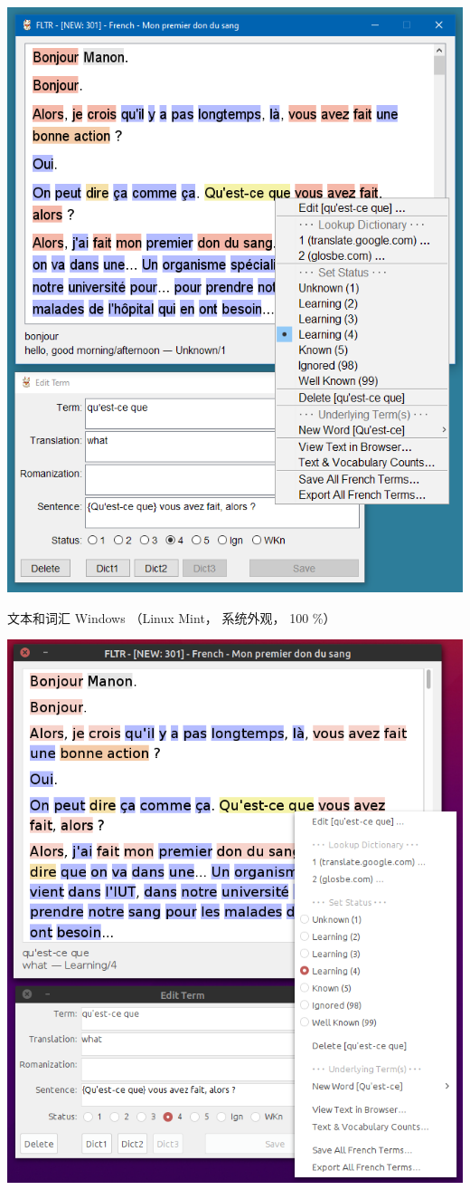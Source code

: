 \documentclass[cn,10pt,math=newtx,citestyle=gb7714-2015,bibstyle=gb7714-2015]{elegantbook}
\begin{document}
\includegraphics[scale=0.5]{image/images-012.png}


文本和词汇 Windows （Linux Mint， 系统外观， 100 \%）

\includegraphics[scale=0.5]{image/images-013.png}
\end{document}
